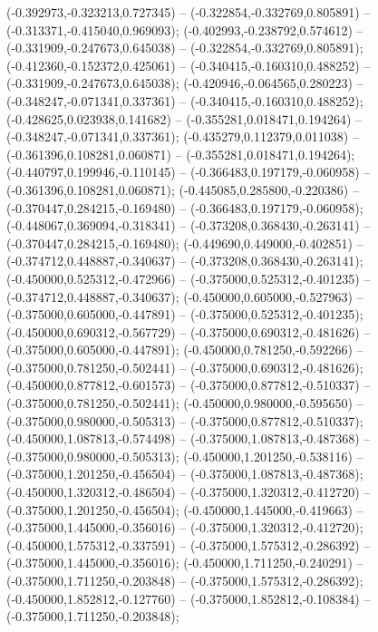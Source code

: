  (-0.392973,-0.323213,0.727345) -- (-0.322854,-0.332769,0.805891) -- (-0.313371,-0.415040,0.969093);
 (-0.402993,-0.238792,0.574612) -- (-0.331909,-0.247673,0.645038) -- (-0.322854,-0.332769,0.805891);
 (-0.412360,-0.152372,0.425061) -- (-0.340415,-0.160310,0.488252) -- (-0.331909,-0.247673,0.645038);
 (-0.420946,-0.064565,0.280223) -- (-0.348247,-0.071341,0.337361) -- (-0.340415,-0.160310,0.488252);
 (-0.428625,0.023938,0.141682) -- (-0.355281,0.018471,0.194264) -- (-0.348247,-0.071341,0.337361);
 (-0.435279,0.112379,0.011038) -- (-0.361396,0.108281,0.060871) -- (-0.355281,0.018471,0.194264);
 (-0.440797,0.199946,-0.110145) -- (-0.366483,0.197179,-0.060958) -- (-0.361396,0.108281,0.060871);
 (-0.445085,0.285800,-0.220386) -- (-0.370447,0.284215,-0.169480) -- (-0.366483,0.197179,-0.060958);
 (-0.448067,0.369094,-0.318341) -- (-0.373208,0.368430,-0.263141) -- (-0.370447,0.284215,-0.169480);
 (-0.449690,0.449000,-0.402851) -- (-0.374712,0.448887,-0.340637) -- (-0.373208,0.368430,-0.263141);
 (-0.450000,0.525312,-0.472966) -- (-0.375000,0.525312,-0.401235) -- (-0.374712,0.448887,-0.340637);
 (-0.450000,0.605000,-0.527963) -- (-0.375000,0.605000,-0.447891) -- (-0.375000,0.525312,-0.401235);
 (-0.450000,0.690312,-0.567729) -- (-0.375000,0.690312,-0.481626) -- (-0.375000,0.605000,-0.447891);
 (-0.450000,0.781250,-0.592266) -- (-0.375000,0.781250,-0.502441) -- (-0.375000,0.690312,-0.481626);
 (-0.450000,0.877812,-0.601573) -- (-0.375000,0.877812,-0.510337) -- (-0.375000,0.781250,-0.502441);
 (-0.450000,0.980000,-0.595650) -- (-0.375000,0.980000,-0.505313) -- (-0.375000,0.877812,-0.510337);
 (-0.450000,1.087813,-0.574498) -- (-0.375000,1.087813,-0.487368) -- (-0.375000,0.980000,-0.505313);
 (-0.450000,1.201250,-0.538116) -- (-0.375000,1.201250,-0.456504) -- (-0.375000,1.087813,-0.487368);
 (-0.450000,1.320312,-0.486504) -- (-0.375000,1.320312,-0.412720) -- (-0.375000,1.201250,-0.456504);
 (-0.450000,1.445000,-0.419663) -- (-0.375000,1.445000,-0.356016) -- (-0.375000,1.320312,-0.412720);
 (-0.450000,1.575312,-0.337591) -- (-0.375000,1.575312,-0.286392) -- (-0.375000,1.445000,-0.356016);
 (-0.450000,1.711250,-0.240291) -- (-0.375000,1.711250,-0.203848) -- (-0.375000,1.575312,-0.286392);
 (-0.450000,1.852812,-0.127760) -- (-0.375000,1.852812,-0.108384) -- (-0.375000,1.711250,-0.203848);
